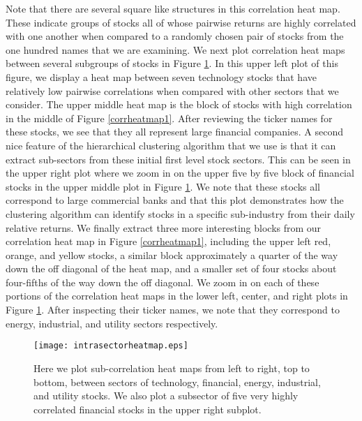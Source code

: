 \documentclass{amsart}
\begin{document}
Note that there are several square like structures in this correlation heat map.  These  
indicate groups of stocks all of whose pairwise returns are highly correlated with 
one another when compared to a randomly chosen pair of stocks from the one hundred 
names that we are examining. We next plot correlation heat maps between several 
subgroups of stocks in Figure \ref{intracor}. In this upper left plot of this 
figure, we display a heat map between seven technology stocks that have relatively 
low pairwise correlations when compared with other sectors that we consider.  
The upper middle heat map is the block of stocks with high correlation in the 
middle of Figure \ref{corrheatmap1}. 
After reviewing the ticker names for these stocks, 
we see that they all represent large financial companies. A second nice feature of the 
hierarchical clustering algorithm that we use is that it can extract sub-sectors from these 
initial first level stock sectors.  This 
can be seen in the upper right plot where we zoom in on the upper five by five 
block of financial stocks in the upper middle plot in Figure \ref{intracor}.  
We note that these stocks all correspond to large commercial banks 
and that this plot demonstrates how the clustering algorithm can identify stocks in 
a specific sub-industry from their daily relative returns.  We finally
extract three more interesting blocks from our correlation heat map in Figure \ref{corrheatmap1},
including the upper left red, orange, and yellow stocks, a similar block approximately a quarter 
of the way down the off diagonal of the heat map, and a smaller set of four stocks about 
four-fifths of the way down the off diagonal.  We zoom in on each of these portions of 
the correlation heat maps in the
lower left, center, and right plots in Figure \ref{intracor}. After inspecting their 
ticker names, we note that they correspond to energy, industrial, and utility sectors respectively. 

\begin{figure}[h!]
    \centering
    \texttt{[image: intrasectorheatmap.eps]}
    \caption{Here we plot sub-correlation heat maps from left to right, top to bottom, 
        between sectors of technology, financial,
    energy, industrial, and utility stocks.  We also plot a subsector of five very highly 
    correlated financial stocks in the upper right subplot.}
    \label{intracor}
\end{figure}
\end{document}
